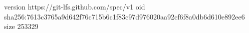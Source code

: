 version https://git-lfs.github.com/spec/v1
oid sha256:7613c3765a9d642f76c715b6c1f83c97d976020aa92cf6f8a0db6d610e892ee6
size 253329
